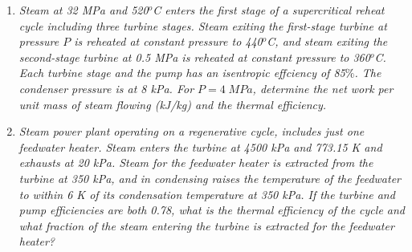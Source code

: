 \documentclass[12pts,a4paper,amsmath,amssymb,floatfix]{article}%
\begin{document}
\begin{enumerate}[label=\bfseries Problem \arabic*]
\item {\it Steam at 32 MPa and 520$^{o}$C enters the first stage of a supercritical reheat cycle including three turbine stages. Steam exiting the first-stage turbine at pressure $P$ is reheated at constant pressure to 440$^{o}$C, and steam exiting the second-stage turbine at 0.5 MPa is reheated at constant pressure to 360$^{o}$C.  Each turbine stage and the pump has an isentropic effciency of 85$\%$. The condenser pressure is at 8 kPa. For $P=4\;MPa$, determine the net work per unit mass of steam flowing (kJ/kg) and the thermal efficiency.}


\item \label{P:example8_9}{\it Steam power plant operating on a regenerative cycle, includes just one feedwater heater. Steam enters the turbine at 4500 kPa and 773.15 K and exhausts at 20 kPa. Steam for the feedwater heater is extracted from the turbine at 350 kPa, and in condensing raises the temperature of the feedwater to within 6 K of its condensation temperature at 350 kPa. If the turbine and pump efficiencies are both 0.78, what is the thermal efficiency of the cycle and what fraction of the steam entering the turbine is extracted for the feedwater heater?}

\end{enumerate}
\end{document}
